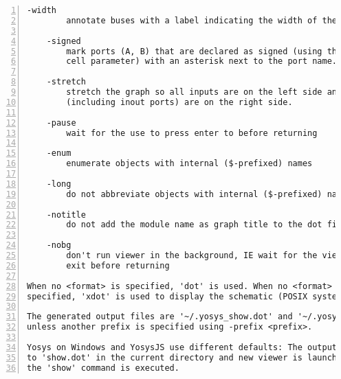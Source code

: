 \begin{lstlisting}[numbers=left,frame=single]
    -width
        annotate buses with a label indicating the width of the bus.

    -signed
        mark ports (A, B) that are declared as signed (using the [AB]_SIGNED
        cell parameter) with an asterisk next to the port name.

    -stretch
        stretch the graph so all inputs are on the left side and all outputs
        (including inout ports) are on the right side.

    -pause
        wait for the use to press enter to before returning

    -enum
        enumerate objects with internal ($-prefixed) names

    -long
        do not abbreviate objects with internal ($-prefixed) names

    -notitle
        do not add the module name as graph title to the dot file

    -nobg
        don't run viewer in the background, IE wait for the viewer tool to
        exit before returning

When no <format> is specified, 'dot' is used. When no <format> and <viewer> is
specified, 'xdot' is used to display the schematic (POSIX systems only).

The generated output files are '~/.yosys_show.dot' and '~/.yosys_show.<format>',
unless another prefix is specified using -prefix <prefix>.

Yosys on Windows and YosysJS use different defaults: The output is written
to 'show.dot' in the current directory and new viewer is launched each time
the 'show' command is executed.
\end{lstlisting}

